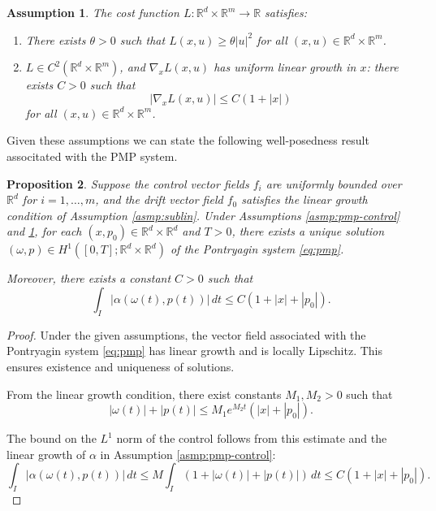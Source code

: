 \documentclass{article}
\newtheorem{theorem}{Theorem}[section]
\newtheorem{proposition}[theorem]{Proposition}
\newtheorem{assumption}[theorem]{Assumption}
\newcommand{\Rd}{\mathbb{R}^d}
\newcommand{\R}{\mathbb{R}}
\begin{document}
\begin{assumption}
\label{asmp:cost}
The cost function $L: \mathbb{R}^d \times \mathbb{R}^m \rightarrow \mathbb{R}$ satisfies:
\begin{enumerate}
\item There exists $\theta > 0$ such that $L(x,u) \geq \theta |u|^2$ for all $(x,u) \in \mathbb{R}^d \times \mathbb{R}^m$.
\item $L \in C^2(\mathbb{R}^d \times \mathbb{R}^m)$, and $\nabla_x L(x, u)$ has uniform linear growth in $x$: there exists $C > 0$ such that
\[|\nabla_x L(x, u)| \leq C(1 + |x|)\]
for all $(x, u) \in \mathbb{R}^d \times \mathbb{R}^m$.
\end{enumerate}
\end{assumption}
Given these assumptions we can state the following well-posedness result associtated with the PMP system.
\begin{proposition}
\label{prop:pmp-existence}
Suppose the control vector fields $f_i$ are uniformly bounded over $\mathbb{R}^d$ for $i = 1,\ldots,m$, and the drift vector field $f_0$ satisfies the linear growth condition of Assumption \ref{asmp:sublin}. Under Assumptions \ref{asmp:pmp-control} and \ref{asmp:cost}, for each $(x,p_0) \in \mathbb{R}^d \times \mathbb{R}^d$ and $T > 0$, there exists a unique solution $(\omega,p) \in H^1([0,T]; \mathbb{R}^d \times \mathbb{R}^d)$ of the Pontryagin system \eqref{eq:pmp}.

Moreover, there exists a constant $C > 0$ such that 
\[\int_I |\alpha(\omega(t),p(t))| \, dt \leq C(1 + |x| + |p_0|).\]
\end{proposition}

\begin{proof}
Under the given assumptions, the vector field associated with the Pontryagin system \eqref{eq:pmp} has linear growth and is locally Lipschitz. This ensures existence and uniqueness of solutions.

From the linear growth condition, there exist constants $M_1, M_2 > 0$ such that 
\[|\omega(t)| + |p(t)| \leq M_1 e^{M_2 t}(|x| + |p_0|).\]

The bound on the $L^1$ norm of the control follows from this estimate and the linear growth of $\alpha$ in Assumption \ref{asmp:pmp-control}:
\[\int_I |\alpha(\omega(t),p(t))| \, dt \leq M \int_I (1 + |\omega(t)| + |p(t)|) \, dt \leq C(1 + |x| + |p_0|).\]
\end{proof}


\end{document}
